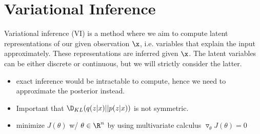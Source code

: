 \section{Variational Inference}
Variational inference (VI) is a method where we aim to compute latent representations of our given observation $\x$, i.e. variables that explain the input approximately. These representations are inferred given $\x$. The latent variables can be either discrete or continuous, but we will strictly consider the latter. 

\begin{itemize}
    \item exact inference would be intractable to compute, hence we need to approximate the posterior instead. 
    \item Important that $\D_{KL}(q(z|x)||p(z|x))$ is not symmetric.
    \item minimize $J(\theta)$ w/ $\theta \in \R^n$ by using multivariate calculus $\triangledown_{\theta}J(\theta) = 0$
\end{itemize}
